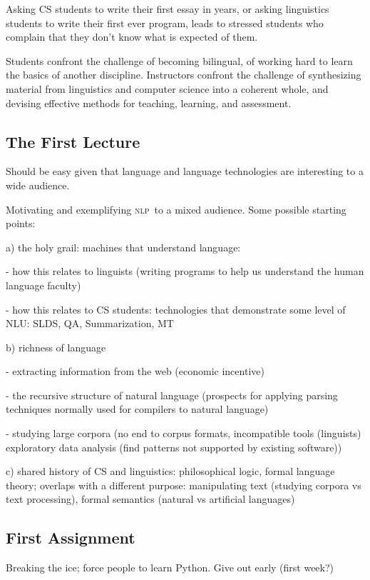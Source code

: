 \documentclass[11pt]{article}
\newcommand{\NLP}{\textsc{nlp}}
\begin{document}
Asking CS students to write their first essay in years, or asking
linguistics students to write their first ever program, leads to
stressed students who complain that they don't know what is expected
of them.

Students confront the challenge of becoming bilingual,
of working hard to learn the basics of another discipline.  Instructors confront the
challenge of synthesizing material from linguistics and computer science into a coherent
whole, and devising effective methods for teaching, learning, and assessment.


\subsection{The First Lecture}

Should be easy given that language and language technologies are interesting
to a wide audience.

Motivating and exemplifying \NLP\ to a mixed audience.
Some possible starting points:

a) the holy grail: machines that understand language:

- how this relates to linguists (writing programs to help us
  understand the human language faculty)

- how this relates to CS students: technologies that demonstrate some level of NLU:
  SLDS, QA, Summarization, MT

b) richness of language

- extracting information from the web (economic incentive)

- the recursive structure of natural language (prospects for applying
  parsing techniques normally used for compilers to natural language)

- studying large corpora
  (no end to corpus formats, incompatible tools (linguists)
  exploratory data analysis (find patterns not supported by existing software))

c) shared history of CS and linguistics: philosophical logic, formal language theory;
overlaps with a different purpose:
manipulating text (studying corpora vs text processing),
formal semantics (natural vs artificial languages)

\subsection{First Assignment}

Breaking the ice; force people to learn Python.  Give out early (first week?)
\end{document}
